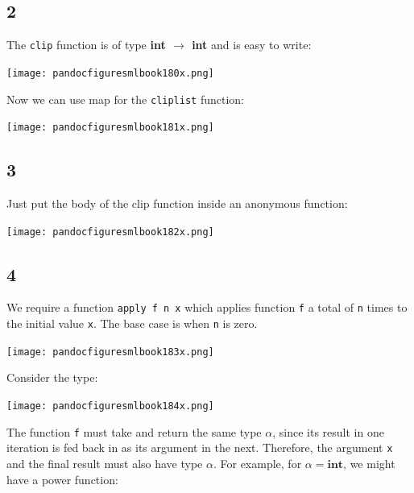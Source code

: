 \documentclass[]{book}
\begin{document}
\subsection*{2}
The \texttt{clip} function is of type \textbf{\textsf{int $\rightarrow$ int}} and is easy to write:

\medskip
\begin{center}
\noindent\texttt{[image: pandocfiguresmlbook180x.png]}
\end{center}
\medskip

\noindent Now we can use map for the \texttt{cliplist} function:

\medskip
\begin{center}
\noindent\texttt{[image: pandocfiguresmlbook181x.png]}
\end{center}
\medskip

\subsection*{3}
Just put the body of the clip function inside an anonymous function:

\medskip
\begin{center}
\noindent\texttt{[image: pandocfiguresmlbook182x.png]}
\end{center}
\medskip

\subsection*{4}
We require a function \texttt{apply f n x} which applies function \texttt{f} a total of \texttt{n} times to the initial value \texttt{x}. The base case is when \texttt{n} is zero.

\medskip
\begin{center}
\noindent\texttt{[image: pandocfiguresmlbook183x.png]}
\end{center}
\medskip

\noindent Consider the type:

\medskip
\begin{center}
\noindent\texttt{[image: pandocfiguresmlbook184x.png]}
\end{center}
\medskip

\noindent The function \texttt{f} must take and return the same type $\alpha$, since its result in one iteration is fed back in as its argument in the next. Therefore, the argument \texttt{x} and the final result must also have type $\alpha$. For example, for $\alpha = \textbf{int}$, we might have a power function:
\end{document}

